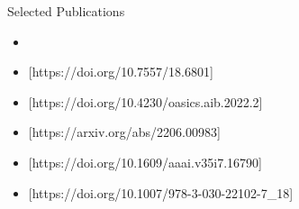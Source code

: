%

\begin{rSection}{Selected Publications}
    \begin{itemize}
        \item {}
        \item {}[https://doi.org/10.7557/18.6801]
        \item {}[https://doi.org/10.4230/oasics.aib.2022.2]
        \item {}[https://arxiv.org/abs/2206.00983]
        \item {}[https://doi.org/10.1609/aaai.v35i7.16790]
        \item {}[https://doi.org/10.1007/978-3-030-22102-7_18]
    \end{itemize} 
\end{rSection}
